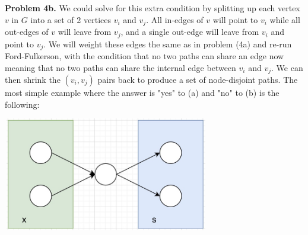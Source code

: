 \documentclass{article}
\begin{document}
\hfill

\textbf{Problem 4b.} We could solve for this extra condition by splitting up each vertex $v$ in $G$ into a set of 2 vertices $v_i$ and $v_j$. All in-edges of $v$ will point to $v_i$ while all out-edges of $v$ will leave from $v_j$, and a single out-edge will leave from $v_i$ and point to $v_j$. We will weight these edges the same as in problem (4a) and re-run Ford-Fulkerson, with the condition that no two paths can share an edge now meaning that no two paths can share the internal edge between $v_i$ and $v_j$. We can then shrink the $(v_i, v_j)$ pairs back to produce a set of node-disjoint paths. The most simple example where the answer is "yes" to (a) and "no" to (b) is the following:

\begin{center}
    \includegraphics[width=9cm, height=5cm]{images/problem-4-example.jpg}
\end{center}

\newpage
 

\end{document}
